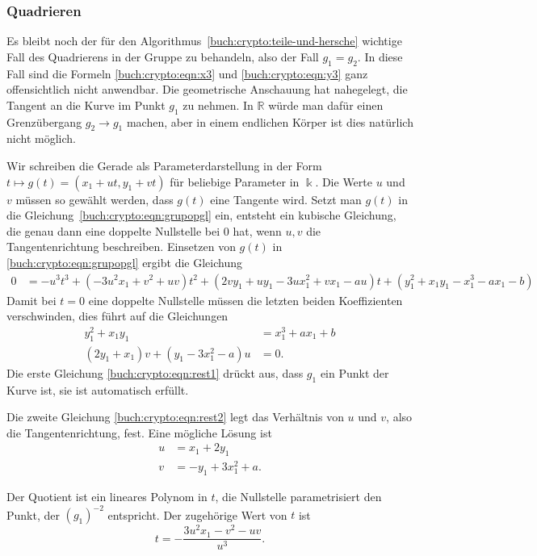\subsubsection{Quadrieren}
Es bleibt noch der für den Algorithmus~\ref{buch:crypto:teile-und-hersche}
wichtige Fall des Quadrierens in der Gruppe zu
behandeln, also der Fall $g_1=g_2$.
In diese Fall sind die Formeln
\eqref{buch:crypto:eqn:x3}
und
\eqref{buch:crypto:eqn:y3}
ganz offensichtlich nicht anwendbar.
Die geometrische Anschauung hat nahegelegt, die Tangent an die Kurve
im Punkt $g_1$ zu nehmen.
In $\mathbb{R}$ würde man dafür einen Grenzübergang $g_2\to g_1$ machen,
aber in einem endlichen Körper ist dies natürlich nicht möglich.

Wir schreiben die Gerade als Parameterdarstellung in der Form
\(
t\mapsto g(t)= (x_1+ut, y_1+vt)
\)
für beliebige Parameter in $\Bbbk$.
Die Werte $u$ und $v$ müssen so gewählt werden, dass $g(t)$ eine
Tangente wird.
Setzt man $g(t)$ in die Gleichung~\eqref{buch:crypto:eqn:grupopgl} ein,
entsteht ein kubische Gleichung, die genau dann eine doppelte Nullstelle
bei $0$ hat, wenn $u,v$ die Tangentenrichtung beschreiben.
Einsetzen von $g(t)$ in \eqref{buch:crypto:eqn:grupopgl}
ergibt die Gleichung
\begin{align}
0
&=
-u^3t^3
+
(-3u^2x_{1}+v^2+uv)t^2
+
(2vy_1+uy_1-3ux_1^2+vx_1-au)t
+
(y_1^2+x_1y_1-x_1^3-ax_1-b)
\label{buch:crypto:eqn:tangente1}
\end{align}
Damit bei $t=0$ eine doppelte Nullstelle müssen die letzten beiden
Koeffizienten verschwinden, dies führt auf die Gleichungen
\begin{align}
y_1^2+x_1y_1&=x_1^3+ax_1+b
\label{buch:crypto:eqn:rest1}
\\
(2y_1
+x_1)v
+(y_1
-3x_1^2
-a)u
&=0.
\label{buch:crypto:eqn:rest2}
\end{align}
Die erste Gleichung \eqref{buch:crypto:eqn:rest1} drückt aus,
dass $g_1$ ein Punkt der Kurve ist, sie ist automatisch erfüllt.

Die zweite Gleichung
\eqref{buch:crypto:eqn:rest2}
legt das Verhältnis von $u$ und $v$, also die
Tangentenrichtung, fest.
Eine mögliche Lösung ist
\begin{equation}
\begin{aligned}
u &= x_1+2y_1
\\
v &= -y_1+3x_1^2+a.
\end{aligned}
\label{buch:crypto:eqn:uv}
\end{equation}

Der Quotient ist ein lineares Polynom in $t$, die Nullstelle parametrisiert
den Punkt, der $(g_1)^{-2}$ entspricht.
Der zugehörige Wert von $t$ ist
\begin{equation}
t=-\frac{3u^2x_1-v^2-uv}{u^3}.
\label{buch:crypto:eqn:t}
\end{equation}


